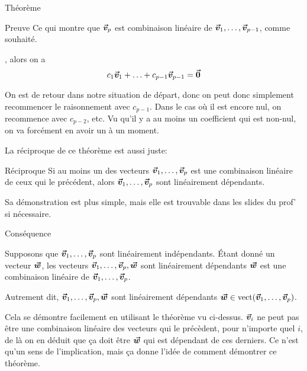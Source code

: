 \documentclass{article}
\begin{document}
\begin{parag}{Théorème}
\begin{subparag}{Preuve}
        Ce qui montre que $\bm{\protect\vec{v}}_p$ est combinaison linéaire de $\bm{\protect\vec{v}}_1, \ldots, \bm{\protect\vec{v}}_{p-1}$, comme souhaité.

        \vspace{1em}
        , alors on a 
        \[c_1 \bm{\protect\vec{v}}_1 + \ldots + c_{p-1} \bm{\protect\vec{v}}_{p - 1} = \bm{\protect\vec{0}}\]
        
        On est de retour dans notre situation de départ, donc on peut donc simplement recommencer le raisonnement avec $c_{p-1}$. Dans le cas où il est encore nul, on recommence avec $c_{p-2}$, etc. Vu qu'il y a au moins un coefficient qui est non-nul, on va forcément en avoir un à un moment. 
    \end{subparag}

    La réciproque de ce théorème est aussi juste: 

    \begin{subparag}{Réciproque}
        Si au moins un des vecteurs $\bm{\protect\vec{v}}_1, \ldots, \bm{\protect\vec{v}}_p$ est une combinaison linéaire de ceux qui le précédent, alors $\bm{\protect\vec{v}}_1, \ldots, \bm{\protect\vec{v}}_p$ sont linéairement dépendants.
    \end{subparag}

    Sa démonstration est plus simple, mais elle est trouvable dans les slides du prof' si nécessaire.
    
    \begin{subparag}{Conséquence}

       Supposons que $\bm{\protect\vec{v}}_1, \ldots, \bm{\protect\vec{v}}_p$ sont linéairement indépendants. Étant donné un vecteur $\bm{\protect\vec{w}}$, les vecteurs $\bm{\protect\vec{v}}_1, \ldots, \bm{\protect\vec{v}}_p, \bm{\protect\vec{w}}$ sont linéairement dépendants  $\bm{\protect\vec{w}}$ est une combinaison linéaire de $\bm{\protect\vec{v}}_1, \ldots, \bm{\protect\vec{v}}_p$. 

       Autrement dit, $\bm{\protect\vec{v}}_1, \ldots, \bm{\protect\vec{v}}_p, \bm{\protect\vec{w}}$ sont linéairement dépendants  $\bvec{w} \in \vect\left(\bvec{v}_1, \ldots, \bvec{v}_p\right)$.

       Cela se démontre facilement en utilisant le théorème vu ci-dessus. $\bm{\protect\vec{v}}_i$ ne peut pas être une combinaison linéaire des vecteurs qui le précèdent, pour n'importe quel $i$, de là on en déduit que ça doit être $\bm{\protect\vec{w}}$ qui est dépendant de ces derniers. Ce n'est qu'un sens de l'implication, mais ça donne l'idée de comment démontrer ce théorème.
    \end{subparag}
    
\end{parag}
\end{document}
